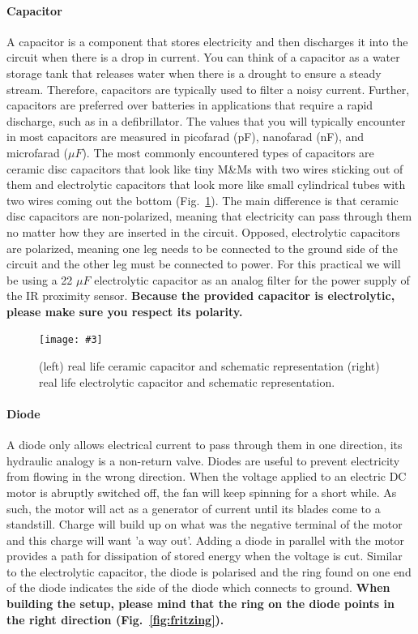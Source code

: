 \documentclass[10pt,twoside,openright]{article}
\newcommand{\mijnfiguur}[5][ht]{            %
    \begin{figure}[#1]                      %
        \begin{center}                      %
            \texttt{[image: \#3]}        %
        \end{center}
        \caption{#4\label{#5}}          %
    \end{figure}
    }
\begin{document}
\paragraph{Capacitor}
A capacitor is a component that stores electricity and then discharges it into the circuit when there is a drop in current. You can think of a capacitor as a water storage tank that releases water when there is a drought to ensure a steady stream. Therefore, capacitors are typically used to filter a noisy current. Further, capacitors are preferred over batteries in applications that require a rapid discharge, such as in a defibrillator. The values that you will typically encounter in most capacitors are measured in picofarad (pF), nanofarad (nF), and microfarad ($\mu F$). The most commonly encountered types of capacitors are ceramic disc capacitors that look like tiny M\&Ms with two wires sticking out of them and electrolytic capacitors that look more like small cylindrical tubes with two wires coming out the bottom (Fig.~\ref{fig:capacitor}). The main difference is that ceramic disc capacitors are non-polarized, meaning that electricity can pass through them no matter how they are inserted in the circuit. Opposed, electrolytic capacitors are polarized, meaning one leg needs to be connected to the ground side of the circuit and the other leg must be connected to power. For this practical we will be using a 22 $\mu F$ electrolytic capacitor as an analog filter for the power supply of the IR proximity sensor. \textbf{Because the provided capacitor is electrolytic, please make sure you respect its polarity.}

\mijnfiguur[h!]{width=7cm}{capacitor.jpg}{(left) real life ceramic capacitor and schematic representation (right) real life electrolytic capacitor and schematic representation.}{fig:capacitor}


\paragraph{Diode}
A diode only allows electrical current to pass through them in one direction, its hydraulic analogy is a non-return valve. Diodes are useful to prevent electricity from flowing in the wrong direction. When the voltage applied to an electric DC motor is abruptly switched off, the fan will keep spinning for a short while. As such, the motor will act as a generator of current until its blades come to a standstill. Charge will build up on what was the negative terminal of the motor and this charge will want 'a way out'. Adding a diode in parallel with the motor provides a path for dissipation of stored energy when the voltage is cut. Similar to the electrolytic capacitor, the diode is polarised and the ring found on one end of the diode indicates the side of the diode which connects to ground. \textbf{When building the setup, please mind that the ring on the diode points in the right direction (Fig.~\ref{fig:fritzing}).}
\end{document}
